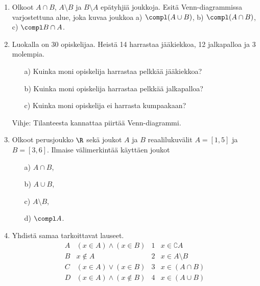 \begin{enumerate}
\begin{center}



\end{center}

\item
Olkoot $A \cap B$, $A \setminus B$ ja $B \setminus A$ epätyhjiä joukkoja. Esitä Venn-diagrammissa varjostettuna alue, joka kuvaa joukkoa a) $\compl (A \cup B)$, b) $\compl (A \cap B)$, c) $\compl B \cap A$.

\item Luokalla on 30 opiskelijaa. Heistä 14 harrastaa jääkiekkoa, 12 jalkapalloa ja 3 molempia. 
\begin{itemize}
\item[a)] Kuinka moni opiskelija harrastaa pelkkää jääkiekkoa?
\item[b)] Kuinka moni opiskelija harrastaa pelkkää jalkapalloa?
\item[c)] Kuinka moni opiskelija ei harrasta kumpaakaan?
\end{itemize}
Vihje: Tilanteesta kannattaa piirtää Venn-diagrammi.

\item Olkoot perusjoukko $\R$ sekä joukot $A$ ja $B$ reaalilukuvälit $A=[1,5]$ ja $B=[3,6]$. Ilmaise välimerkintää käyttäen joukot
\begin{itemize}
\item[a)] $A \cap B$,
\item[b)] $A \cup B$,
\item[c)] $A \setminus B$,
\item[d)] $\compl A$.
\end{itemize}

\item Yhdistä samaa tarkoittavat lauseet.
\[
\begin{array}{llll}
A & (x\in A)\land (x\in B) & 1 & x\in \complement A \\
B & x\notin A & 2 & x \in A\setminus B \\
C & (x\in A)\lor (x\in B) & 3 & x\in (A\cap B) \\
D & (x\in A)\land (x\notin B) & 4 & x\in (A\cup B)
\end{array}
\]


\end{enumerate}
